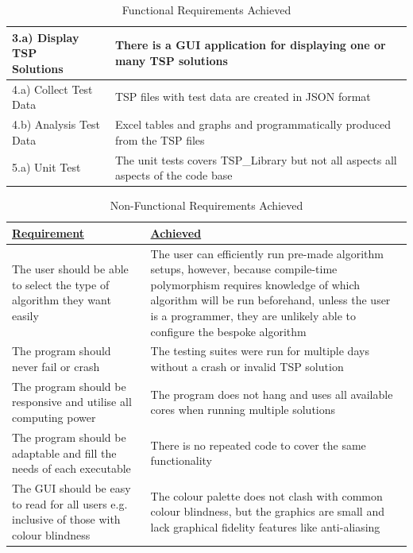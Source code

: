\begin{table}[H]
\begin{tabularx}{\textwidth}{|p{4cm}|X|}
 \makecell[l]{3.a) Display TSP \\ Solutions}                     &  There is a GUI application for displaying one or many TSP solutions \\ \hline
4.a) Collect Test Data                         &  TSP files with test data are created in JSON format \\ \hline
4.b) Analysis Test Data                        &  Excel tables and graphs and programmatically produced from the TSP files   \\ \hline
5.a) Unit Test                                 &  The unit tests covers TSP\_Library but not all aspects all aspects of the code base  \\ \hline
    \end{tabularx}
    \caption{Functional Requirements Achieved}
    \label{tab:functionalachieved}
\end{table}

\begin{table}[H]
    \centering
    \renewcommand{\arraystretch}{1.2} %
    \begin{tabularx}{\textwidth}{|X|X|}
    \hline
{\ul \textbf{Requirement}}                                                                         & {\ul \textbf{Achieved}} \\ \hline
The user should be able to select the type of algorithm they want easily                   & The user can efficiently run pre-made algorithm setups, however, because compile-time polymorphism requires knowledge of which algorithm will be run beforehand, unless the user is a programmer, they are unlikely able to configure the bespoke algorithm            \\ \hline
The program should never fail or crash                                                     & The testing suites were run for multiple days without a crash or invalid TSP solution          \\ \hline
The program should be responsive and utilise all computing power                           & The program does not hang and uses all available cores when running multiple solutions         \\ \hline
The program should be adaptable and fill the needs of each executable                      & There is no repeated code to cover the same functionality       \\ \hline
The GUI should be easy to read for all users e.g. inclusive of those with colour blindness &      The colour palette does not clash with common colour blindness, but the graphics are small and lack graphical fidelity features like anti-aliasing             \\ \hline
    \end{tabularx}
    \caption{Non-Functional Requirements Achieved}
    \label{tab:nonfunctionalachieved}
\end{table}
\pagebreak
